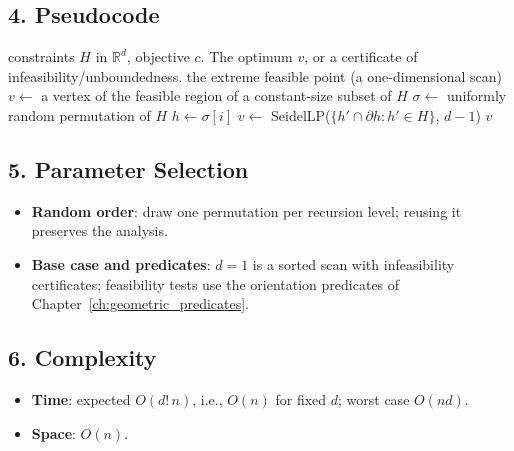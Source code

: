 \subsection{4. Pseudocode}

\begin{algorithm}[htbp]
\caption{Seidel's Randomized Linear Programming}
\label{alg:rand_lp_seidel}
\begin{algorithmic}[1]
\Require constraints $H$ in $\mathbb{R}^d$, objective $c$.
\Ensure The optimum $v$, or a certificate of infeasibility/unboundedness.
    \State \Return the extreme feasible point (a one-dimensional scan)
  \EndIf
  \State $v \gets$ a vertex of the feasible region of a constant-size subset of $H$
  \State $\sigma \gets$ uniformly random permutation of $H$
    \State $h \gets \sigma[i]$
      \State {}
      \State $v \gets$ SeidelLP($\{ h' \cap \partial h : h' \in H \}$, $d - 1$)
    \EndIf
  \EndFor
  \State \Return $v$
\EndFunction
\end{algorithmic}
\end{algorithm}

\subsection{5. Parameter Selection}

\begin{itemize}
\item \textbf{Random order}: draw one permutation per recursion level; reusing
  it preserves the analysis.
\item \textbf{Base case and predicates}: $d = 1$ is a sorted scan with
  infeasibility certificates; feasibility tests use the orientation predicates
  of Chapter~\ref{ch:geometric_predicates}.
\end{itemize}

\subsection{6. Complexity}

\begin{itemize}
\item \textbf{Time}: expected $O(d!\,n)$, i.e., $O(n)$ for fixed $d$; worst
  case $O(nd)$.
\item \textbf{Space}: $O(n)$.
\end{itemize}

